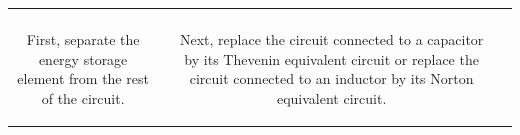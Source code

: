 \documentclass[aspectratio=169]{beamer}
\begin{document}
\begin{frame}[fragile]
\begin{tabular}{cc}
\begin{columns}
\begin{column}{.5\textwidth}
				\end{column}				
		\end{columns}\\
		
\begin{columns}
	\begin{column}{.5\textwidth}  %
\tiny					First, separate the energy storage element from the
rest of the circuit.
		
				\end{column}
		
	\begin{column}{.5\textwidth}  %
\tiny					Next, replace the circuit connected
to a capacitor by its Thevenin equivalent circuit or
replace the circuit connected to an inductor by its Norton
equivalent circuit.
		
				\end{column}		
		
		
		
		\end{columns}\\		
		
		
		
		
	\end{tabular}	
	
	
	
	
	
	
\end{frame}
\end{document}
